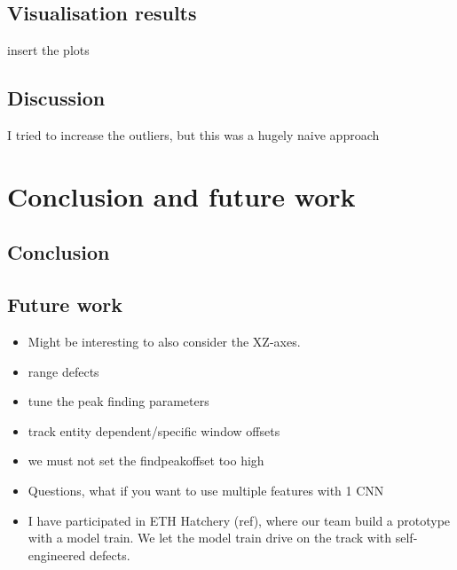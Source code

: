 \section{Visualisation results}
insert the plots

\section{Discussion}
I tried to increase the outliers, but this was a hugely naive approach

\chapter{Conclusion and future work}

\section{Conclusion}

\section{Future work}

\begin{itemize}
	\item Might be interesting to also consider the XZ-axes.
	\item range defects
	\item tune the peak finding parameters
	\item track entity dependent/specific window offsets
	\item we must not set the findpeakoffset too high
	\item Questions, what if you want to use multiple features with 1 CNN
	\item I have participated in ETH Hatchery (ref), where our team build a prototype with a model train. We let the model train drive on the track with self-engineered defects.

\end{itemize}

\newpage
